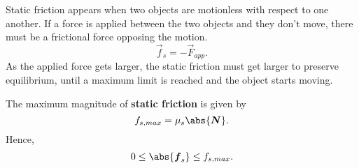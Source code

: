 \documentclass[../classical_mechanics.tex]{subfiles}
\begin{document}
        Static friction appears when two objects are motionless with respect to one another.
        If a force is applied between the two objects and they don't move, there must be a frictional force opposing the motion.
        \begin{equation}
            \vec{f}_s=-\vec{F}_{app}.
        \end{equation}
        As the applied force gets larger, the static friction must get larger to preserve equilibrium, until a maximum limit is reached and the object starts moving.
        \begin{definition}
            The maximum magnitude of \textbf{static friction} is given by
            \begin{equation}
                f_{s,max}=\mu_s\abs{\vec{N}}.
            \end{equation}
            Hence,
            \begin{equation}
                0\leq\abs{\vec{f}_s}\leq f_{s,max}.
            \end{equation}
        \end{definition}
\end{document}
